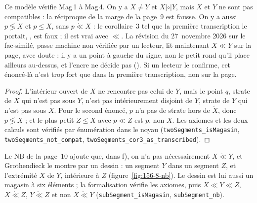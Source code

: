 \begin{encadre}
\begin{contrexemple}
Ce modèle vérifie Mag\,1 à Mag\,4. On y a $X \neq Y$ et $X \mathrel{|\circ|} Y$, mais $X$ et $Y$ ne sont pas compatibles : la réciproque  de la marge de la page~9 est fausse. On y a aussi $p \lessgtr X$ et $p \leq X$, sans $p \mathrel{\mathring\ll} X$ : le corollaire~3 tel que la première transcription le portait, , est faux ; il est vrai avec $\ll$. La révision du 27~novembre 2026 sur le fac-similé, passe machine non vérifiée par un lecteur, lit maintenant $X \ll Y$ sur la page, avec doute : il y a un point à gauche du signe, non le petit rond qu'il place ailleurs au-dessus, et l'encre ne décide pas (). Si un lecteur le confirme, cet énoncé-là n'est trop fort que dans la première transcription, non sur la page.
\end{contrexemple}
\end{encadre}

\begin{proof}
L'intérieur ouvert de $X$ ne rencontre pas celui de $Y$, mais le point $q$, strate de $X$ qui n'est pas sous $Y$, n'est pas intérieurement disjoint de $Y$, strate de $Y$ qui n'est pas sous $X$. Pour le second énoncé, $p$ n'a pas de strate hors de $\widetilde X$, donc $p \lessgtr X$ ; et le plus petit $Z \leq X$ avec $p \ll Z$ est $p$, non $X$. Les axiomes et les deux calculs sont vérifiés par énumération dans le noyau (\texttt{twoSegments\_isMagasin}, \texttt{twoSegments\_not\_compat}, \texttt{twoSegments\_cor3\_as\_transcribed}).
\end{proof}

Le NB de la page~10 ajoute que, dans f), on n'a pas nécessairement $X \mathrel{\mathring\ll} Y$, et Grothendieck le montre par un dessin : un segment $Y$ dans un segment $Z$, et l'extrémité $X$ de $Y$, intérieure à $Z$ (figure~\ref{fig:156-8-nb}). Le dessin est lui aussi un magasin à six éléments ; la formalisation vérifie les axiomes, puis $X \ll Y \ll Z$, $X \mathrel{\mathring\ll} Z$, $Y \mathrel{\mathring\ll} Z$ et non $X \mathrel{\mathring\ll} Y$ (\texttt{subSegment\_isMagasin}, \texttt{subSegment\_nb}).

